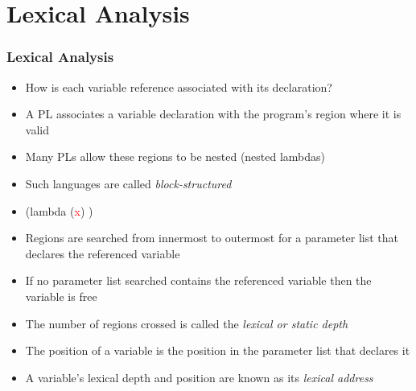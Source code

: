 \documentclass{beamer}
\begin{document}
\section{Lexical Analysis}

\begin{frame}[fragile]
\frametitle{Lexical Analysis}
\begin{scriptsize}
\begin{itemize}
\item<1-> How is each variable reference associated with its declaration?

\item<2-> A PL associates a variable declaration with the program's region where it is valid

\item<3-> Many PLs allow these regions to be nested (nested lambdas)

\item<4-> Such languages are called \emph{block-structured}

\item<5->
(lambda (\textcolor{red}{x})\newline
 \color{red}\color{black})

\item<5-> Regions are searched from innermost to outermost for a parameter list that declares the referenced variable

\item<5-> If no parameter list searched contains the referenced variable then the variable is free

\item<6-> The number of regions crossed is called the \emph{lexical or static depth}

\item<6-> The position of a variable is the position in the parameter list that declares it

\item<6-> A variable's lexical depth and position are known as its \emph{lexical address}
\end{itemize}
\end{scriptsize}
\end{frame}
\end{document}
